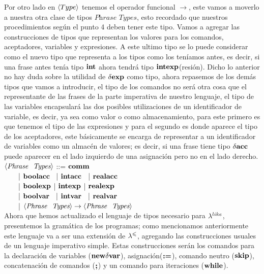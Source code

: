 Por otro lado en $\langle Type \rangle$ tenemos el operador funcional $\rightarrow$, este vamos 
a moverlo a nuestra otra clase de tipos $\textit{Phrase Types}$, esto recordado
que nuestros procedimientos seg\'un el punto 4 deben tener este tipo. Vamos a agregar las
construcciones de tipos que representan los valores para los comandos, aceptadores, variables y 
expresiones. A este ultimo tipo se lo puede considerar como el nuevo tipo que 
representa a los tipos como los ten\'iamos antes, es decir, si una frase antes
ten\'ia tipo $\textbf{int}$ ahora tendr\'a tipo $\textbf{int}\textbf{exp}$(resi\'on). Dicho lo
anterior no hay duda sobre la utilidad de $\delta \textbf{exp}$ como tipo, ahora repasemos
de los dem\'as tipos que vamos a introducir, el tipo de los comandos no ser\'a
otra cosa que el representante de las frases de la parte imperativa de
nuestro lenguaje, el tipo de las variables encapsular\'a las dos posibles utilizaciones
de un identificador de variable, es decir, ya sea como valor o como almacenamiento,
para este primero es que tenemos el tipo de las expresiones y para el segundo es
donde aparece el tipo de los aceptadores, este b\'asicamente se encarga de 
representar a un identificador de variables como un almac\'en de valores; es
decir, si una frase tiene tipo $\delta \textbf{acc}$ puede aparecer en el lado izquierdo
de una asignaci\'on pero no en el lado derecho.\\

\noindent
$\langle \textit{Phrase \ Types} \rangle$ ::= $\textbf{comm}$\\
\indent \indent \indent \indent \ \ \ \
| $\textbf{boolacc}$ \ | $\textbf{intacc}$ \ | $\textbf{realacc}$\\
\indent \indent \indent \indent \ \ \ \
| $\textbf{boolexp}$ | $\textbf{intexp}$ | $\textbf{realexp}$\\
\indent \indent \indent \indent \ \ \ \
| $\textbf{boolvar}$ \ | $\textbf{intvar}$ \ | $\textbf{realvar}$\\
\indent \indent \indent \indent \ \ \ \
| $\langle \textit{Phrase \ Types} \rangle \rightarrow \langle \textit{Phrase \ Types} \rangle$\\

Ahora que hemos actualizado el lenguaje de tipos necesario para $\lambda^{like}$, presentemos
la gram\'atica de los programas; como mencionamos anteriormente este lenguaje va a 
ser una extensi\'on de $\lambda^{\leqslant}$, agregando las construcciones usuales de un lenguaje 
imperativo simple. Estas construcciones 
ser\'an los comandos para la declaraci\'on de variables ($\textbf{new} \delta \textbf{var}$), 
asignaci\'on($\textbf{:=}$), comando neutro ($\textbf{skip}$), concatenaci\'on de comandos ($\textbf{;}$)
y un comando para iteraciones ($\textbf{while}$).\\


